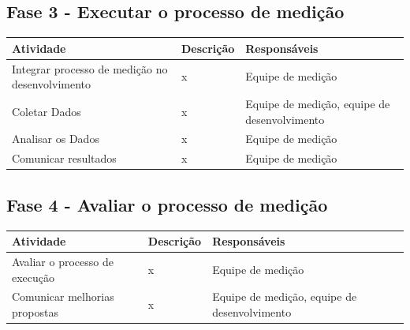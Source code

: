 \subsection{Fase 3 - Executar o processo de medição}

	\begin{tabular}{ |p{4cm}|p{6cm}| p{3cm} |}
	 \hline
	 Atividade 		& 		Descrição & Responsáveis \\
	 \hline
	 	Integrar processo de medição no desenvolvimento & x &  Equipe de medição \\
	 \hline
	 	Coletar Dados & x &  Equipe de medição, equipe de desenvolvimento \\
	 \hline
	 	Analisar os Dados & x &  Equipe de medição \\
	 \hline
	 	Comunicar resultados & x &  Equipe de medição \\
	 \hline
	\end{tabular}

\subsection{Fase 4 - Avaliar o processo de medição}

	\begin{tabular}{ |p{4cm}|p{6cm}| p{3cm} |}

	 \hline
	 Atividade 		& 		Descrição & Responsáveis \\
	 \hline
	 	Avaliar o processo de execução & x &  Equipe de medição \\
	 \hline
	 	Comunicar melhorias propostas & x &  Equipe de medição, equipe de desenvolvimento \\
	 \hline

	\end{tabular}
